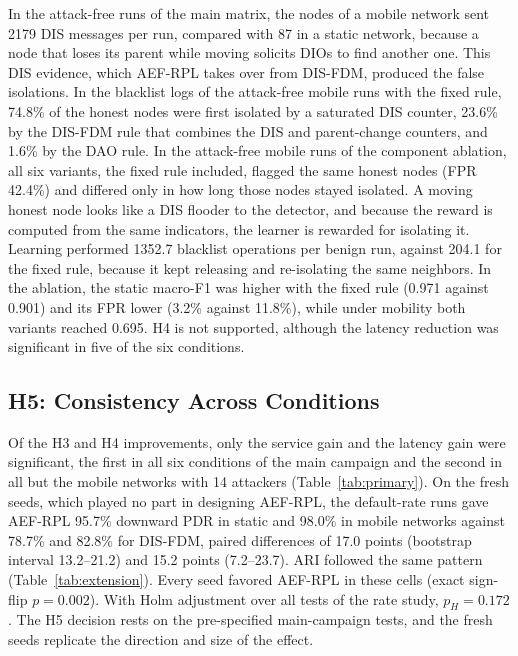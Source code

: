 In the attack-free runs of the main matrix, the nodes of a mobile network sent 2179 DIS messages per run, compared with 87 in a static network, because a node that loses its parent while moving solicits DIOs to find another one. This DIS evidence, which AEF-RPL takes over from DIS-FDM, produced the false isolations. In the blacklist logs of the attack-free mobile runs with the fixed rule, 74.8\% of the honest nodes were first isolated by a saturated DIS counter, 23.6\% by the DIS-FDM rule that combines the DIS and parent-change counters, and 1.6\% by the DAO rule. In the attack-free mobile runs of the component ablation, all six variants, the fixed rule included, flagged the same honest nodes (FPR 42.4\%) and differed only in how long those nodes stayed isolated. A moving honest node looks like a DIS flooder to the detector, and because the reward is computed from the same indicators, the learner is rewarded for isolating it. Learning performed 1352.7 blacklist operations per benign run, against 204.1 for the fixed rule, because it kept releasing and re-isolating the same neighbors. In the ablation, the static macro-F1 was higher with the fixed rule (0.971 against 0.901) and its FPR lower (3.2\% against 11.8\%), while under mobility both variants reached 0.695. H4 is not supported, although the latency reduction was significant in five of the six conditions.

\subsection{H5: Consistency Across Conditions}
Of the H3 and H4 improvements, only the service gain and the latency gain were significant, the first in all six conditions of the main campaign and the second in all but the mobile networks with 14 attackers (Table~\ref{tab:primary}). On the fresh seeds, which played no part in designing AEF-RPL, the default-rate runs gave AEF-RPL 95.7\% downward PDR in static and 98.0\% in mobile networks against 78.7\% and 82.8\% for DIS-FDM, paired differences of 17.0 points (bootstrap interval 13.2--21.2) and 15.2 points (7.2--23.7). ARI followed the same pattern (Table~\ref{tab:extension}). Every seed favored AEF-RPL in these cells (exact sign-flip $p=0.002$). With Holm adjustment over all tests of the rate study, $p_H=0.172$. The H5 decision rests on the pre-specified main-campaign tests, and the fresh seeds replicate the direction and size of the effect.

\begin{table}[t]
\caption{Fresh-seed replication at the default rate (seven attackers, seeds 21--30). New recall is the fraction of attackers newly flagged after onset.}\label{tab:extension}
\centering\footnotesize
\end{table}

